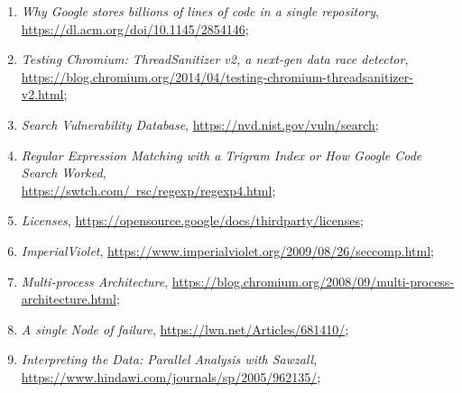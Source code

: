 \documentclass[a4paper,11pt]{article}
\begin{document}
\begin{enumerate}
\item \textit{Why Google stores billions of lines of code in a single
    repository},
  \href{https://dl.acm.org/doi/10.1145/2854146}{https://dl.acm.org/doi/10.1145/2854146};



\item \textit{Testing Chromium: ThreadSanitizer v2, a next-gen data
    race
    detector}, \\
  \href{https://blog.chromium.org/2014/04/testing-chromium-threadsanitizer-v2.html}{https://blog.chromium.org/2014/04/testing-chromium-threadsanitizer-v2.html};



\item \textit{Search Vulnerability Database},
  \href{https://nvd.nist.gov/vuln/search}{https://nvd.nist.gov/vuln/search};



\item \textit{Regular Expression Matching with a Trigram Index or How
    Google Code Search Worked}, \\
  \href{https://swtch.com/~rsc/regexp/regexp4.html}{https://swtch.com/~rsc/regexp/regexp4.html};



\item \textit{Licenses},
  \href{https://opensource.google/docs/thirdparty/licenses}{https://opensource.google/docs/thirdparty/licenses};



\item \textit{ImperialViolet},
  \href{https://www.imperialviolet.org/2009/08/26/seccomp.html}{https://www.imperialviolet.org/2009/08/26/seccomp.html};



\item \textit{Multi-process Architecture},
  \href{https://blog.chromium.org/2008/09/multi-process-architecture.html}{https://blog.chromium.org/2008/09/multi-process-architecture.html};



\item \textit{A single Node of failure},
  \href{https://lwn.net/Articles/681410/}{https://lwn.net/Articles/681410/};



\item \textit{Interpreting the Data: Parallel Analysis with Sawzall},
  \href{https://www.hindawi.com/journals/sp/2005/962135/}{https://www.hindawi.com/journals/sp/2005/962135/};




\end{enumerate}
\end{document}
